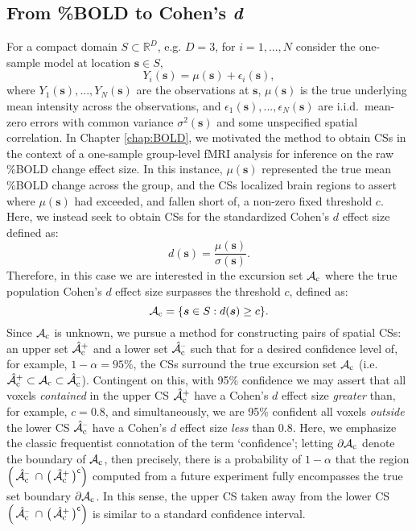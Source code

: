 \subsection{From \%BOLD to Cohen's \textit{d}}
\label{sec:BOLD_to_cohen}
For a compact domain $S \subset \mathbb{R}^{D}$, e.g. $D = 3$, for $i = 1, ..., N$  consider the one-sample model at location $\bm{s} \in S$,
\begin{equation}
\label{eq:Cohen_GLM}
Y_{i}(\bm{s}) = \mu(\bm{s}) + \epsilon_{i}(\bm{s}),
\end{equation}
where $Y_{1}(\bm{s}), ..., Y_{N}(\bm{s})$ are the observations at $\bm{s}$, $\mu(\bm{s})$ is the true underlying mean intensity across the observations,  
and $\epsilon_{1}(\bm{s}), ..., \epsilon_{N}(\bm{s})$ are i.i.d.\ mean-zero errors with common variance $\sigma^2(\bm{s})$ and some unspecified spatial correlation. In Chapter \ref{chap:BOLD}, we motivated the method to obtain CSs in the context of a one-sample group-level fMRI analysis for inference on the raw \%BOLD change effect size. In this instance, $\mu(\bm{s})$ represented the true mean \%BOLD change across the group, and the CSs localized brain regions to assert where $\mu(\bm{s})$ had exceeded, and fallen short of, a non-zero fixed threshold $c$. Here, we instead seek to obtain CSs for the standardized Cohen's $d$ effect size defined as:
\begin{equation}
\label{eq:cohens_d}
d(\bm{s}) = \frac{\mu(\bm{s})}{\sigma(\bm{s})}.
\end{equation}
Therefore, in this case we are interested in the excursion set $\operatorname{\mathcal{A}_{c}}$ where the true population Cohen's $d$ effect size surpasses the threshold $c$, defined as: 
\begin{equation}
\label{eq:Ac}
\operatorname{\mathcal{A}_{c}} = \{\bm{s} \in S : d(\bm{s}) \geq c \}.
\end{equation}
Since $\operatorname{\mathcal{A}_{c}}$ is unknown, we pursue a method for constructing pairs of spatial CSs: an upper set $\operatorname{\hat{\mathcal{A}}_{c}^+}$ and a lower set $\operatorname{\hat{\mathcal{A}}_{c}^{\textrm{--}}}$ such that for a desired confidence level of, for example, $1 - \alpha = 95\%$, the CSs surround the true excursion set $\operatorname{\mathcal{A}_{c}}$ \Big(i.e. $\operatorname{\hat{\mathcal{A}}_{c}^+} \subset \operatorname{\mathcal{A}_{c}} \subset \operatorname{\hat{\mathcal{A}}_{c}^{\textrm{--}}}$\Big). Contingent on this, with 95\% confidence we may assert that all voxels \textit{contained} in the upper CS $\operatorname{\hat{\mathcal{A}}_{c}^+}$ have a Cohen's $d$ effect size \textit{greater} than, for example, $c = 0.8$, and simultaneously, we are 95\% confident all voxels \textit{outside} the lower CS $\operatorname{\hat{\mathcal{A}}_{c}^{\textrm{--}}}$ have a Cohen's $d$ effect size \textit{less} than 0.8. Here, we emphasize the classic frequentist connotation of the term `confidence'; letting $\operatorname{\partial\mathcal{A}_{c}}$ denote the boundary of $\operatorname{\mathcal{A}_{c}}$, then precisely, there is a probability of $1 - \alpha$ that the region $\Big(\Ahatcm \ \cap \ \big(\Ahatcp\big)^{\mathsf{c}}\Big)$ computed from a future experiment fully encompasses the true set boundary $\operatorname{\partial\mathcal{A}_{c}}$. In this sense, the upper CS taken away from the lower CS $\Big(\Ahatcm \ \cap \ \big(\Ahatcp\big)^{\mathsf{c}}\Big)$ is similar to a standard confidence interval. 

